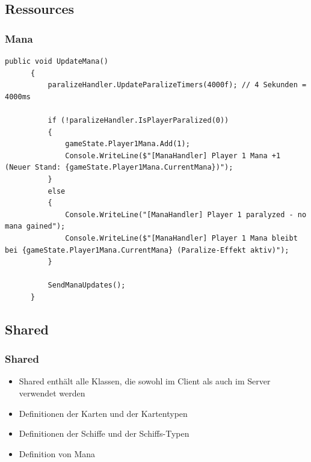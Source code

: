 \documentclass{beamer}
\begin{document}
\subsection{Ressources}
\begin{frame}[fragile]
\frametitle{Mana}
  \begin{lstlisting}[language=CSharp, basicstyle=\ttfamily\tiny, breaklines=true]
    public void UpdateMana()
      {
          paralizeHandler.UpdateParalizeTimers(4000f); // 4 Sekunden = 4000ms

          if (!paralizeHandler.IsPlayerParalized(0))
          {
              gameState.Player1Mana.Add(1);
              Console.WriteLine($"[ManaHandler] Player 1 Mana +1 (Neuer Stand: {gameState.Player1Mana.CurrentMana})");
          }
          else
          {
              Console.WriteLine("[ManaHandler] Player 1 paralyzed - no mana gained");
              Console.WriteLine($"[ManaHandler] Player 1 Mana bleibt bei {gameState.Player1Mana.CurrentMana} (Paralize-Effekt aktiv)");
          }

          SendManaUpdates();
      }
    \end{lstlisting}
\end{frame}

\subsection{Shared}
\begin{frame}
\frametitle{Shared}
  \begin{itemize}
    \item Shared enthält alle Klassen, die sowohl im Client als auch im Server verwendet werden
    \item Definitionen der Karten und der Kartentypen
    \item Definitionen der Schiffe und der Schiffs-Typen
    \item Definition von Mana
  \end{itemize}
\end{frame}
\end{document}
